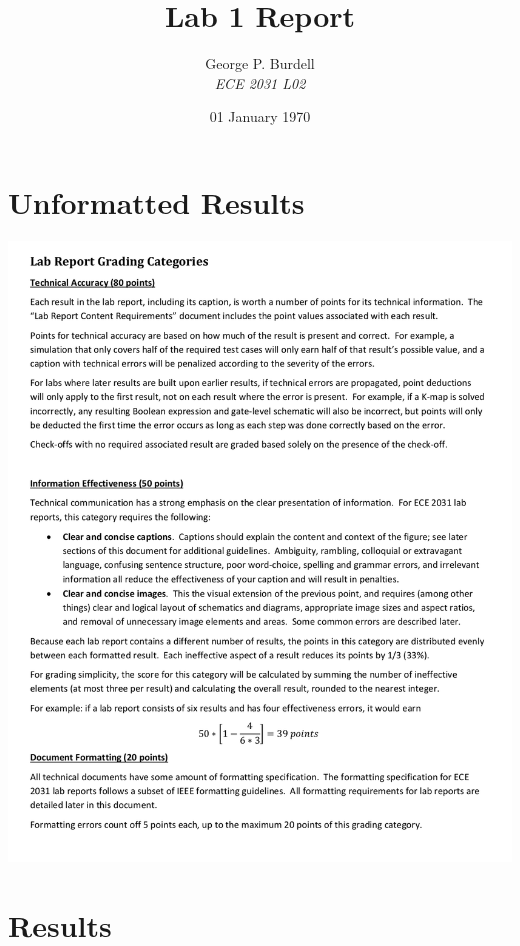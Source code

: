 \documentclass[letterpaper,11pt]{article}
\begin{document}
\title{Lab 1 Report}
\author{George P. Burdell \\
\emph{ECE 2031 L02}}          
\date{01 January 1970}
\maketitle
\thispagestyle{empty}
\tableofcontents
\newpage

\section{Unformatted Results}
\includegraphics{unformatted.png}

\section{Results}
\end{document}
